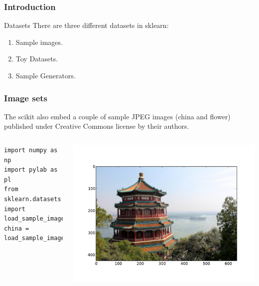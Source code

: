 \documentclass[10pt, colorlinks]{beamer}
\begin{document}
\begin{frame}[fragile]\frametitle{Introduction}
\begin{block}{Datasets}
There are three different datasets in sklearn:
\begin{enumerate}
    \item Sample images.
    \item Toy Datasets.
    \item Sample Generators.
\end{enumerate}
\end{block}
\end{frame}
\begin{frame}[fragile]\frametitle{Image sets}
The scikit also embed a couple of sample JPEG images (china and flower) published under Creative Commons license by their authors.
\begin{columns}[c]

\small
\begin{verbatim}
import numpy as np
import pylab as pl
from sklearn.datasets import load_sample_image
china = load_sample_image("china.jpg")
\end{verbatim}

\includegraphics[width=\textwidth]{plwfigis/CursP_4_figure2}

\end{columns}

\end{frame}
\end{document}
